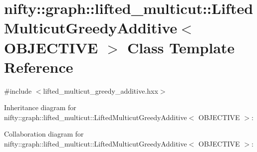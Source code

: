 \hypertarget{classnifty_1_1graph_1_1lifted__multicut_1_1LiftedMulticutGreedyAdditive}{}\section{nifty\+:\+:graph\+:\+:lifted\+\_\+multicut\+:\+:Lifted\+Multicut\+Greedy\+Additive$<$ O\+B\+J\+E\+C\+T\+I\+V\+E $>$ Class Template Reference}
\label{classnifty_1_1graph_1_1lifted__multicut_1_1LiftedMulticutGreedyAdditive}


{\ttfamily \#include $<$lifted\+\_\+multicut\+\_\+greedy\+\_\+additive.\+hxx$>$}



Inheritance diagram for nifty\+:\+:graph\+:\+:lifted\+\_\+multicut\+:\+:Lifted\+Multicut\+Greedy\+Additive$<$ O\+B\+J\+E\+C\+T\+I\+V\+E $>$\+:


Collaboration diagram for nifty\+:\+:graph\+:\+:lifted\+\_\+multicut\+:\+:Lifted\+Multicut\+Greedy\+Additive$<$ O\+B\+J\+E\+C\+T\+I\+V\+E $>$\+:

